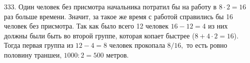 333. Один человек без присмотра начальника потратил бы на работу в $8\cdot2=16$ раз больше времени. Значит, за такое же время с работой справились бы 16 человек без присмотра. Так как было всего 12 человек $16-12=4$ из них должны были быть во второй группе, которая копает быстрее ($8+4\cdot2=16$). Тогда первая группа из $12-4=8$ человек прокопала $8/16,$ то есть ровно половину траншеи, $1000:2=500$ метров.\\
